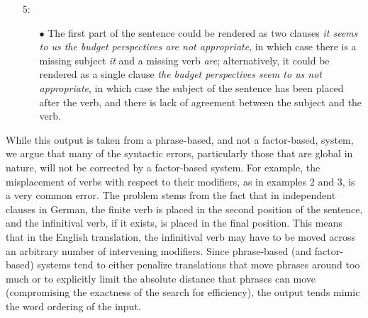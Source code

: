 \documentclass[11pt]{report}
\theoremstyle{plain}
\begin{document}
{\begin{itemize}
\begin{itemize}
well-formed (the insertion of the verb {\em be} would make it so).
\end{itemize}
\item[5:]
\begin{itemize}
\item[$\bullet$] The first part of the sentence could be rendered as
two clauses {\em it seems to us the budget perspectives are not
appropriate}, in which case there is a missing subject {\em it} and a
missing verb {\em are}; alternatively, it could be rendered as a
single clause {\em the budget perspectives seem to us not
appropriate}, in which case the subject of the sentence has been
placed after the verb, and there is lack of agreement between the
subject and the verb.
\end{itemize}
\end{itemize}

While this output is taken from a phrase-based, and not a
factor-based, system, we argue that many of the syntactic errors,
particularly those that are global in nature, will not be corrected by
a factor-based system. For example, the misplacement of verbs with
respect to their modifiers, as in examples 2 and 3, is a very common
error. The problem stems from the fact that in independent clauses in
German, the finite verb is placed in the second position of the
sentence, and the infinitival verb, if it exists, is placed in the
final position. This means that in the English translation, the
infinitival verb may have to be moved across an arbitrary number of
intervening modifiers. Since phrase-based (and factor-based) systems
tend to either penalize translations that move phrases around too much
or to explicitly limit the absolute distance that phrases can move
(compromising the exactness of the search for efficiency), the output
tends mimic the word ordering of the input.

}
\end{document}
